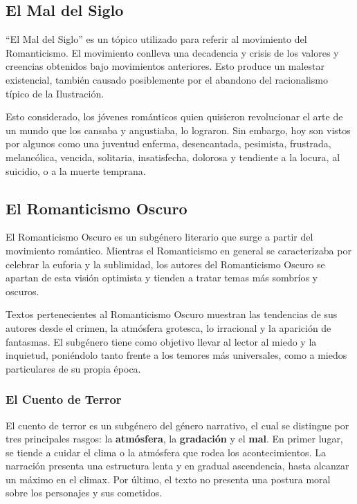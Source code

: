 \documentclass{article}
\begin{document}
\subsection{El Mal del Siglo}

``El Mal del Siglo'' es un tópico utilizado para referir al movimiento del Romanticismo. El movimiento conlleva una decadencia y crisis de los valores y creencias obtenidos bajo movimientos anteriores. Esto produce un malestar existencial, también causado posiblemente por el abandono del racionalismo típico de la Ilustración.

Esto considerado, los jóvenes románticos quien quisieron revolucionar el arte de un mundo que los cansaba y angustiaba, lo lograron. Sin embargo, hoy son vistos por algunos como una juventud enferma, desencantada, pesimista, frustrada, melancólica, vencida, solitaria, insatisfecha, dolorosa y tendiente a la locura, al
suicidio, o a la muerte temprana.

\subsection{El Romanticismo Oscuro}

El Romanticismo Oscuro es un subgénero literario que surge a partir del movimiento romántico. Mientras el Romanticismo en general se caracterizaba por celebrar la euforia y la sublimidad, los autores del Romanticismo Oscuro se apartan de esta visión optimista y tienden a tratar temas más sombríos y oscuros.

Textos pertenecientes al Romanticismo Oscuro muestran las tendencias de sus autores desde el crimen, la atmósfera grotesca, lo irracional y la aparición de fantasmas. El subgénero tiene como objetivo llevar al lector al miedo y la inquietud, poniéndolo tanto frente a los temores más universales, como a miedos particulares de su propia época.

\subsubsection*{El Cuento de Terror}

El cuento de terror es un subgénero del género narrativo, el cual se distingue por tres principales rasgos: la \textbf{atmósfera}, la \textbf{gradación} y el \textbf{mal}. En primer lugar, se tiende a cuidar el clima o la atmósfera que rodea los acontecimientos. La narración presenta una estructura lenta y en gradual ascendencia, hasta alcanzar un máximo en el climax. Por último, el texto no presenta una postura moral sobre los personajes y sus cometidos.
\end{document}
